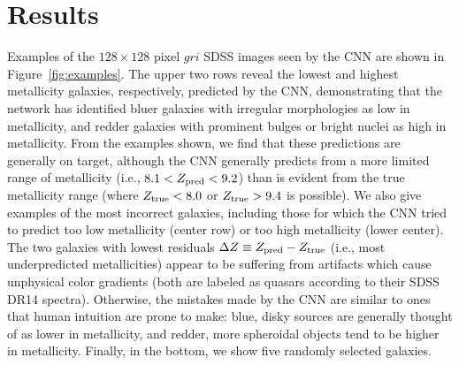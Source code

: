 \documentclass[fleqn,usenatbib]{mnras}
\begin{document}
\section{Results}\label{sec:results}

Examples of the $128 \times 128$ pixel $gri$ SDSS images seen by the CNN are shown in Figure~\ref{fig:examples}.
The upper two rows reveal the lowest and highest metallicity galaxies, respectively, predicted by the CNN, demonstrating that the network has identified bluer galaxies with irregular morphologies as low in metallicity, and redder galaxies with prominent bulges or bright nuclei as high in metallicity.
From the examples shown, we find that these predictions are generally on target, although the CNN generally predicts from a more limited range of metallicity (i.e., $8.1 < Z_{\rm pred} < 9.2$) than is evident from the true metallicity range (where $Z_{\rm true} < 8.0$ or $Z_{\rm true} > 9.4$ is possible).
We also give examples of the most incorrect galaxies, including those for which the CNN tried to predict too low metallicity (center row) or too high metallicity (lower center).
The two galaxies with lowest residuals $\Delta Z \equiv Z_{\rm pred} - Z_{\rm true}$ (i.e., most underpredicted metallicities) appear to be suffering from artifacts which cause unphysical color gradients (both are labeled as quasars according to their SDSS DR14 spectra).
Otherwise, the mistakes made by the CNN are similar to ones that human intuition are prone to make: blue, disky sources are generally thought of as lower in metallicity, and redder, more spheroidal objects tend to be higher in metallicity.
Finally, in the bottom, we show five randomly selected galaxies.
\end{document}
